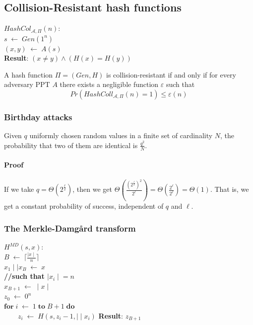 \documentclass[../main]{subfiles}
\begin{document}
\subsection{Collision-Resistant hash functions}
$HashCol_{\mathcal{A}, \Pi{}}(n):$\\
$s \; \leftarrow{} \; Gen(1^n)$\\
$(x, y) \; \leftarrow{} \; A(s)$\\
\textbf{Result}: $(x \neq{} y) \wedge{} (H(x) = H(y))$

\begin{definition}
    A hash function $\Pi{} = (Gen, H)$ is collision-resistant if and only if for every adversary PPT $A$ there exists a negligible function $\varepsilon{}$ such that $$Pr(HashColl_{\mathcal{A}, \Pi{}}(n)=1) \leq{} \varepsilon{}(n)$$
\end{definition}
\subsubsection{Birthday attacks}
\begin{theorem}
    Given $q$ uniformly chosen random values in a finite set of cardinality $N$, the probability that two of them are identical is $\frac{q^2}{N}$.
\end{theorem}
\paragraph{Proof}
If we take $q=\Theta(2^{\frac{\ell}{2}})$, then we get $\Theta(\frac{(2^{\frac{\ell}{2}})^2}{2^\ell}) = \Theta(\frac{2^\ell}{2^\ell}) = \Theta(1)$.
That is, we get a constant probability of success, independent of $q$ and $\ell$.
\subsubsection{The Merkle-Damgård transform}
$H^{MD}(s, x):$\\
$B \; \leftarrow{} \; \lceil{} \frac{\mid{}x\mid{}}{n} \rceil{}$\\
$x_1 \mid\mid{} x_B \; \leftarrow{} \; x$\\
\textbf{//such that $\mid{} x_i \mid{} = n$}\\
$x_{B+1} \; \leftarrow{} \; \mid{} x \mid{}$\\
$z_0 \; \leftarrow{} \; 0^n$\\
$\textbf{for} \; i \; \leftarrow{} \; 1 \; \textbf{to} \; B+1 \; \textbf{do}$\\
$\quad{}\quad{} z_i \; \leftarrow{} \; H(s, z_i - 1, \mid\mid{} x_i)$
\textbf{Result}: $z_{B+1}$
\end{document}
